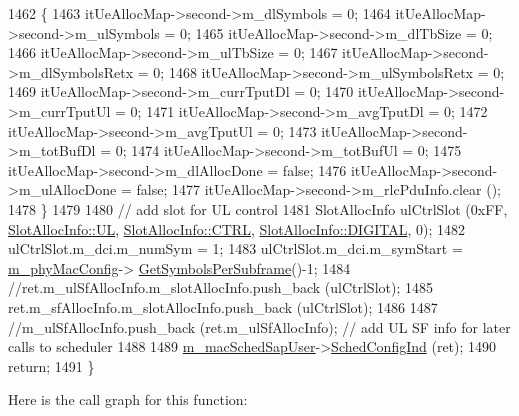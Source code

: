 \begin{DoxyCode}
1462         \{
1463                 itUeAllocMap->second->m\_dlSymbols = 0;
1464                 itUeAllocMap->second->m\_ulSymbols = 0;
1465                 itUeAllocMap->second->m\_dlTbSize = 0;
1466                 itUeAllocMap->second->m\_ulTbSize = 0;
1467                 itUeAllocMap->second->m\_dlSymbolsRetx = 0;
1468                 itUeAllocMap->second->m\_ulSymbolsRetx = 0;
1469                 itUeAllocMap->second->m\_currTputDl = 0;
1470                 itUeAllocMap->second->m\_currTputUl = 0;
1471                 itUeAllocMap->second->m\_avgTputDl = 0;
1472                 itUeAllocMap->second->m\_avgTputUl = 0;
1473                 itUeAllocMap->second->m\_totBufDl = 0;
1474                 itUeAllocMap->second->m\_totBufUl = 0;
1475                 itUeAllocMap->second->m\_dlAllocDone = \textcolor{keyword}{false};
1476                 itUeAllocMap->second->m\_ulAllocDone = \textcolor{keyword}{false};
1477                 itUeAllocMap->second->m\_rlcPduInfo.clear ();
1478         \}
1479 
1480         \textcolor{comment}{// add slot for UL control}
1481         SlotAllocInfo ulCtrlSlot (0xFF, \hyperlink{structns3_1_1SlotAllocInfo_a6cad60db1d39034f1851e2cea625fe5da916b5be54594ead6ed677c570311cad2}{SlotAllocInfo::UL}, 
      \hyperlink{structns3_1_1SlotAllocInfo_a3ea7cb503bfd0c9a4df55a71b81b9331ad78b7d76ef82d56c33be1fa9c1867409}{SlotAllocInfo::CTRL}, \hyperlink{structns3_1_1SlotAllocInfo_adcbd067d82be6260b3399167d8f0b4eca47a67c342db658a08ded9ce4b49417ea}{SlotAllocInfo::DIGITAL}, 0);
1482         ulCtrlSlot.m\_dci.m\_numSym = 1;
1483         ulCtrlSlot.m\_dci.m\_symStart = \hyperlink{classns3_1_1MmWaveMacScheduler_a24d7af4971d2e500fe543cefbafa2fd9}{m\_phyMacConfig}->
      \hyperlink{classns3_1_1MmWavePhyMacCommon_a2fe835b76e3c689defa413e395cd10cb}{GetSymbolsPerSubframe}()-1;
1484         \textcolor{comment}{//ret.m\_ulSfAllocInfo.m\_slotAllocInfo.push\_back (ulCtrlSlot);}
1485         ret.m\_sfAllocInfo.m\_slotAllocInfo.push\_back (ulCtrlSlot);
1486 
1487         \textcolor{comment}{//m\_ulSfAllocInfo.push\_back (ret.m\_ulSfAllocInfo); // add UL SF info for later calls to scheduler}
1488 
1489         \hyperlink{classns3_1_1MmWaveFlexTtiPfMacScheduler_a06177d3b0a466e035764a4101cfafc9e}{m\_macSchedSapUser}->\hyperlink{classns3_1_1MmWaveMacSchedSapUser_ac164dd52215c3924cf421b56089eece4}{SchedConfigInd} (ret);
1490         \textcolor{keywordflow}{return};
1491 \}
\end{DoxyCode}


Here is the call graph for this function\+:




